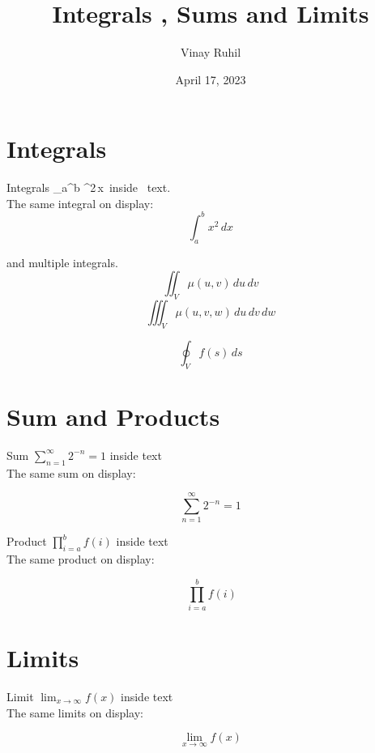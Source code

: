 \documentclass{article}
\title{\textbf{Integrals , Sums and Limits}}
\author{Vinay Ruhil}
\date{April 17, 2023}
\begin{document}
\maketitle
\newpage

\section{Integrals}

Integrals \int_{a}^{b} ^{2}\,x\ inside \ text.\\

The same integral on display:
\[ \int_{a}^{b} x^2 \,dx \] 

and multiple integrals.
\[ \iint_{V} \mu(u,v) \,du \,dv \]
\[ \iiint_{V} \mu(u,v,w) \,du \,dv \,dw \]

\[\oint_{V} f(s)\,ds\]

\section{Sum and Products}

Sum $\sum_{n=1}^{\infty} 2^{-n} = 1$ inside text\\

The same sum on display:

\[ \sum_{n=1}^{\infty} 2^{-n} = 1 \]

Product $\prod_{i=a}^{b} f(i)$ inside text\\

The same product on display:

\[\ \prod_{i=a}^{b} f(i) \]

\section{Limits}

Limit $\lim_{x\to\infty} f(x)$ inside text\\

The same limits on display:

\[ \lim_{x\to\infty} f(x) \]

\newpage
\end{document}

